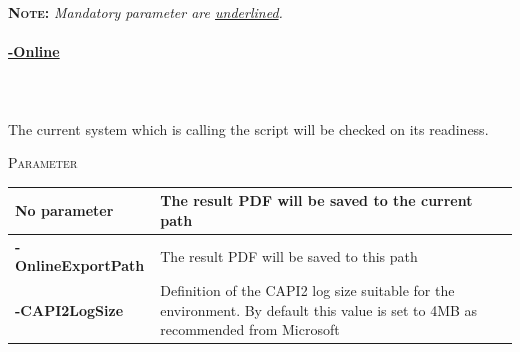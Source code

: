 \vspace{0.5cm}
\textsc{\textbf{Note:}}\textit{ Mandatory parameter are \underline{underlined}.}
\vspace{0.5cm}
\begin{tcolorbox}
    \paragraph{\underline{-Online}} \ \\\\
    The current system which is calling the script will be checked on its readiness.
    \vspace{0.3cm}
    \begin{center}
        \textsc{Parameter}
    \end{center}
    \vspace{-0.5cm}
    \begin{table}[H]
        \def\arraystretch{2}
        \centering
        \begin{tabular}{ p{4cm}  p{10cm} }  \hline
            \textbf{No parameter} & The result PDF will be saved to the current path \\ \hline
            \textbf{-OnlineExportPath} & The result PDF will be saved to this path \\ \hline
            \textbf{-CAPI2LogSize} & Definition of the CAPI2 log size suitable for the environment. By default this value is set to 4MB as recommended from Microsoft  \\ \hline
        \end{tabular}
    \end{table}
\end{tcolorbox}

